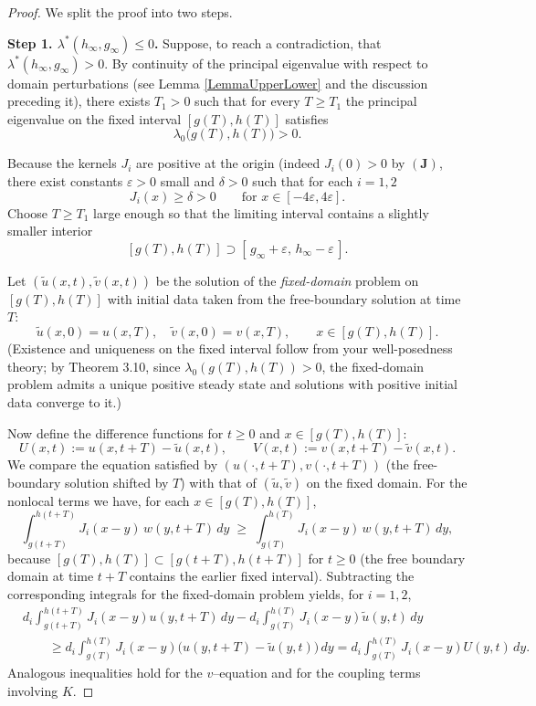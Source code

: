 \documentclass[a4paper,11pt]{amsart}
\theoremstyle{definition}
\numberwithin{equation}{section}
\theoremstyle{definition}
\begin{document}
\begin{proof}
We split the proof into two steps.

\medskip\noindent\textbf{Step 1.   $\lambda^\ast(h_\infty,g_\infty)\leq 0$.}
Suppose, to reach a contradiction, that
\(
\lambda^\ast(h_\infty,g_\infty)>0.
\)
By continuity of the principal eigenvalue with respect to domain perturbations (see Lemma \eqref{LemmaUpperLower} and the discussion preceding it), there exists $T_1>0$ such that for every $T\ge T_1$ the principal eigenvalue on the fixed interval $[g(T),h(T)]$ satisfies
\[
\lambda_0\big(g(T),h(T)\big) > 0.
\]

Because the kernels $J_i$ are positive at the origin (indeed $J_i(0)>0$ by $(\mathbf{J})$, there exist constants $\varepsilon>0$ small and $\delta>0$ such that for each $i=1,2$
\[
J_i(x)\geq \delta>0\qquad\text{for } x\in[-4\varepsilon,4\varepsilon].
\]
Choose $T\geq T_1$ large enough so that the limiting interval contains a slightly smaller interior
\[
[g(T),h(T)] \supset [\,g_\infty+\varepsilon,\,h_\infty-\varepsilon\,].
\]

Let $(\tilde u(x,t),\tilde v(x,t))$ be the solution of the \emph{fixed-domain} problem on $[g(T),h(T)]$ with initial data taken from the free-boundary solution at time $T$:
\[
\tilde u(x,0)= u(x,T),\quad \tilde v(x,0)= v(x,T),\qquad x\in[g(T),h(T)].
\]
(Existence and uniqueness on the fixed interval follow from your well-posedness theory; by Theorem 3.10, since $\lambda_0(g(T),h(T))>0$, the fixed-domain problem admits a unique positive steady state and solutions with positive initial data converge to it.)

Now define the difference functions for $t\geq0$ and $x\in[g(T),h(T)]$:
\[
U(x,t):=u(x,t+T)-\tilde u(x,t),\qquad
V(x,t):=v(x,t+T)-\tilde v(x,t).
\]
We compare the equation satisfied by $(u(\cdot,t+T),v(\cdot,t+T))$ (the free-boundary solution shifted by \(T\)) with that of \((\tilde u,\tilde v)\) on the fixed domain.  For the nonlocal terms we have, for each $x\in[g(T),h(T)]$,
\[
\int_{g(t+T)}^{h(t+T)} J_i(x-y)\,w(y,t+T)\,dy
\;\geq\;
\int_{g(T)}^{h(T)} J_i(x-y)\,w(y,t+T)\,dy,
\]
because $[g(T),h(T)]\subset [g(t+T),h(t+T)]$ for $t\ge0$ (the free boundary domain at time $t+T$ contains the earlier fixed interval). Subtracting the corresponding integrals for the fixed-domain problem yields, for $i=1,2$,
\[
\begin{aligned}
&d_i\int_{g(t+T)}^{h(t+T)} J_i(x-y)u(y,t+T)\,dy - d_i\int_{g(T)}^{h(T)} J_i(x-y)\tilde u(y,t)\,dy \\
&\qquad \geq d_i\int_{g(T)}^{h(T)} J_i(x-y) \big(u(y,t+T)-\tilde u(y,t)\big)\,dy
= d_i\int_{g(T)}^{h(T)} J_i(x-y) U(y,t)\,dy.
\end{aligned}
\]
Analogous inequalities hold for the $v$–equation and for the coupling terms involving $K$.


\end{proof}
\end{document}
